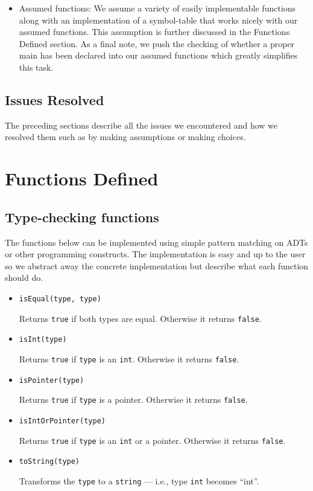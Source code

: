 \documentclass{article}
\begin{document}
\begin{itemize}
    \item Assumed functions: We assume a variety of easily implementable functions along with an implementation of a symbol-table that works nicely with our assumed functions. This assumption is further discussed in the Functions Defined section. As a final note, we push the checking of whether a proper main has been declared into our assumed functions which greatly simplifies this task.
\end{itemize}

\subsection{Issues Resolved}
The preceding sections describe all the issues we encountered and how we resolved them such as by making assumptions or making choices.

\section{Functions Defined}
\subsection{Type-checking functions}
The functions below can be implemented using simple pattern matching on ADTs or other programming constructs. The implementation is easy and up to the user so we abstract away the concrete implementation but describe what each function should do.
\begin{itemize}
    \item \verb|isEqual(type, type)|
    \begin{sloppypar}
    Returns \verb|true| if both types are equal. Otherwise it returns \verb|false|.
    \end{sloppypar}
    \item \verb|isInt(type)|
    \begin{sloppypar}
    Returns \verb|true| if \verb|type| is an \verb|int|. Otherwise it returns \verb|false|.
    \end{sloppypar}
    \item \verb|isPointer(type)|
    \begin{sloppypar}
    Returns \verb|true| if \verb|type| is a pointer. Otherwise it returns \verb|false|.
    \end{sloppypar}
    \item \verb|isIntOrPointer(type)|
    \begin{sloppypar}
    Returns \verb|true| if \verb|type| is an \verb|int| or a pointer. Otherwise it returns \verb|false|.
    \end{sloppypar}
    \item \verb|toString(type)|
    \begin{sloppypar}
    Transforms the \verb|type| to a \verb|string| — i.e., type \texttt{int} becomes ``int''.
    \end{sloppypar}
\end{itemize}
\end{document}
